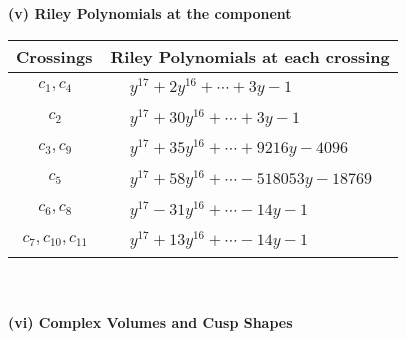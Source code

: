 \documentclass[1p]{elsarticle_modified}
\theoremstyle{definition}
\begin{document}
\newpage\renewcommand{\arraystretch}{1}
\flushleft \textbf{(v) Riley Polynomials at the component}\newline \\
\begin{tabular}{m{50pt}|m{274pt}}
Crossings & \hspace{64pt}Riley Polynomials at each crossing \\
\hline $$\begin{aligned}c_{1},c_{4}\end{aligned}$$&$\begin{aligned}
&y^{17}+2 y^{16}+\cdots+3 y-1
\end{aligned}$\\
\hline $$\begin{aligned}c_{2}\end{aligned}$$&$\begin{aligned}
&y^{17}+30 y^{16}+\cdots+3 y-1
\end{aligned}$\\
\hline $$\begin{aligned}c_{3},c_{9}\end{aligned}$$&$\begin{aligned}
&y^{17}+35 y^{16}+\cdots+9216 y-4096
\end{aligned}$\\
\hline $$\begin{aligned}c_{5}\end{aligned}$$&$\begin{aligned}
&y^{17}+58 y^{16}+\cdots-518053 y-18769
\end{aligned}$\\
\hline $$\begin{aligned}c_{6},c_{8}\end{aligned}$$&$\begin{aligned}
&y^{17}-31 y^{16}+\cdots-14 y-1
\end{aligned}$\\
\hline $$\begin{aligned}c_{7},c_{10},c_{11}\end{aligned}$$&$\begin{aligned}
&y^{17}+13 y^{16}+\cdots-14 y-1
\end{aligned}$\\
\hline
\end{tabular}\\~\\
\newpage\flushleft \textbf{(vi) Complex Volumes and Cusp Shapes}
\end{document}
